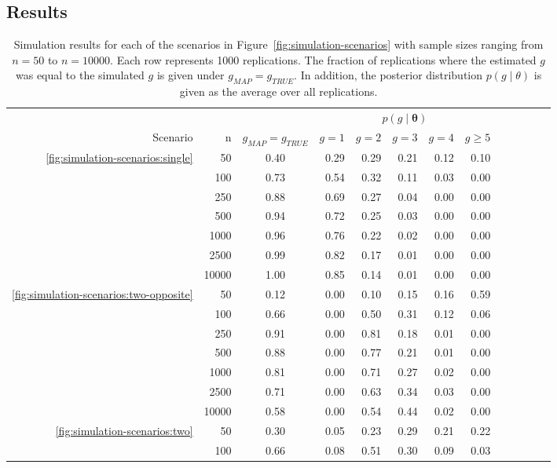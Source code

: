 \subsection{Results}

\begin{table}
	\caption{Simulation results for each of the scenarios in Figure~\ref{fig:simulation-scenarios} with sample sizes ranging from $n=50$ to $n=10000$. Each row represents 1000 replications. The fraction of replications where the estimated $g$ was equal to the simulated $g$ is given under $g_{MAP} = g_{TRUE}$. In addition, the posterior distribution $p(g \mid \theta)$ is given as the average over all replications.}
	\label{tab:simulation-results}
	\centering
	\begin{tabular}{rrcrrrrrrrrrr}
		\hline
		& & & \multicolumn{5}{c}{$p(g \mid \bm{\theta})$} \\
		Scenario & n & $g_{MAP} = g_{TRUE}$ & $g=1$ & $g=2$ & $g=3$ & $g=4$ & $g\geq5$ \\ 
		\hline
		\ref{fig:simulation-scenarios:single} & 50 & 0.40 & 0.29 & 0.29 & 0.21 & 0.12 & 0.10 \\ 
		& 100 & 0.73 & 0.54 & 0.32 & 0.11 & 0.03 & 0.00 \\ 
		& 250 & 0.88 & 0.69 & 0.27 & 0.04 & 0.00 & 0.00 \\ 
		& 500 & 0.94 & 0.72 & 0.25 & 0.03 & 0.00 & 0.00 \\ 
		& 1000 & 0.96 & 0.76 & 0.22 & 0.02 & 0.00 & 0.00 \\ 
		& 2500 & 0.99 & 0.82 & 0.17 & 0.01 & 0.00 & 0.00 \\ 
		& 10000 & 1.00 & 0.85 & 0.14 & 0.01 & 0.00 & 0.00 \\ 
		\hline
		\ref{fig:simulation-scenarios:two-opposite} & 50 & 0.12 & 0.00 & 0.10 & 0.15 & 0.16 & 0.59 \\ 
		& 100 & 0.66 & 0.00 & 0.50 & 0.31 & 0.12 & 0.06 \\ 
		& 250 & 0.91 & 0.00 & 0.81 & 0.18 & 0.01 & 0.00 \\ 
		& 500 & 0.88 & 0.00 & 0.77 & 0.21 & 0.01 & 0.00 \\ 
		& 1000 & 0.81 & 0.00 & 0.71 & 0.27 & 0.02 & 0.00 \\ 
		& 2500 & 0.71 & 0.00 & 0.63 & 0.34 & 0.03 & 0.00 \\ 
		& 10000 & 0.58 & 0.00 & 0.54 & 0.44 & 0.02 & 0.00 \\
		\hline
		\ref{fig:simulation-scenarios:two} & 50 & 0.30 & 0.05 & 0.23 & 0.29 & 0.21 & 0.22 \\ 
		& 100 & 0.66 & 0.08 & 0.51 & 0.30 & 0.09 & 0.03 \\ 

\end{tabular}
\end{table}
